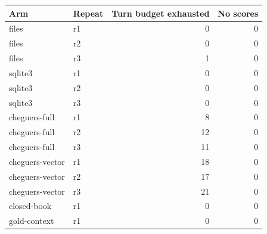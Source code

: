\begin{tabular}{llrr}
\toprule
Arm & Repeat & Turn budget exhausted & No scores \\
\midrule
files & r1 & 0 & 0 \\
files & r2 & 0 & 0 \\
files & r3 & 1 & 0 \\
sqlite3 & r1 & 0 & 0 \\
sqlite3 & r2 & 0 & 0 \\
sqlite3 & r3 & 0 & 0 \\
cheguers-full & r1 & 8 & 0 \\
cheguers-full & r2 & 12 & 0 \\
cheguers-full & r3 & 11 & 0 \\
cheguers-vector & r1 & 18 & 0 \\
cheguers-vector & r2 & 17 & 0 \\
cheguers-vector & r3 & 21 & 0 \\
closed-book & r1 & 0 & 0 \\
gold-context & r1 & 0 & 0 \\
\bottomrule
\end{tabular}
